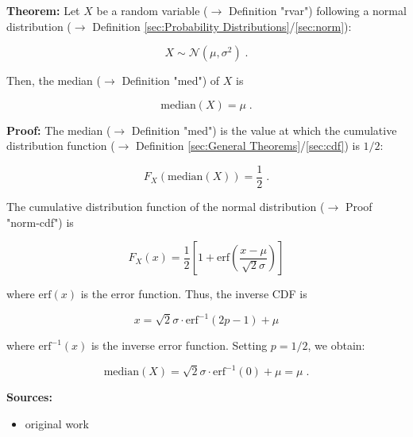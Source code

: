 \documentclass[a4paper,12pt]{book}
\begin{document}
\vspace{1em}
\textbf{Theorem:} Let $X$ be a random variable ($\rightarrow$ Definition "rvar") following a normal distribution ($\rightarrow$ Definition \ref{sec:Probability Distributions}/\ref{sec:norm}):

\begin{equation} \label{eq:norm-med-norm}
X \sim \mathcal{N}(\mu, \sigma^2) \; .
\end{equation}

Then, the median ($\rightarrow$ Definition "med") of $X$ is

\begin{equation} \label{eq:norm-med-norm-median}
\mathrm{median}(X) = \mu \; .
\end{equation}


\vspace{1em}
\textbf{Proof:} The median ($\rightarrow$ Definition "med") is the value at which the cumulative distribution function ($\rightarrow$ Definition \ref{sec:General Theorems}/\ref{sec:cdf}) is $1/2$:

\begin{equation} \label{eq:norm-med-median}
F_X(\mathrm{median}(X)) = \frac{1}{2} \; .
\end{equation}

The cumulative distribution function of the normal distribution ($\rightarrow$ Proof "norm-cdf") is

\begin{equation} \label{eq:norm-med-norm-cdf}
F_X(x) = \frac{1}{2} \left[ 1 + \mathrm{erf} \left( \frac{x-\mu}{\sqrt{2}\sigma} \right) \right]
\end{equation}

where $\mathrm{erf}(x)$ is the error function. Thus, the inverse CDF is

\begin{equation} \label{eq:norm-med-norm-cdf-inv}
x = \sqrt{2}\sigma \cdot \mathrm{erf}^{-1}(2p-1) + \mu
\end{equation}

where $\mathrm{erf}^{-1}(x)$ is the inverse error function. Setting $p = 1/2$, we obtain:

\begin{equation} \label{eq:norm-med-norm-med-qed}
\mathrm{median}(X) = \sqrt{2}\sigma \cdot \mathrm{erf}^{-1}(0) + \mu = \mu \; .
\end{equation}

\vspace{1em}
\textbf{Sources:}
\begin{itemize}
\item original work\end{itemize}
\end{document}
